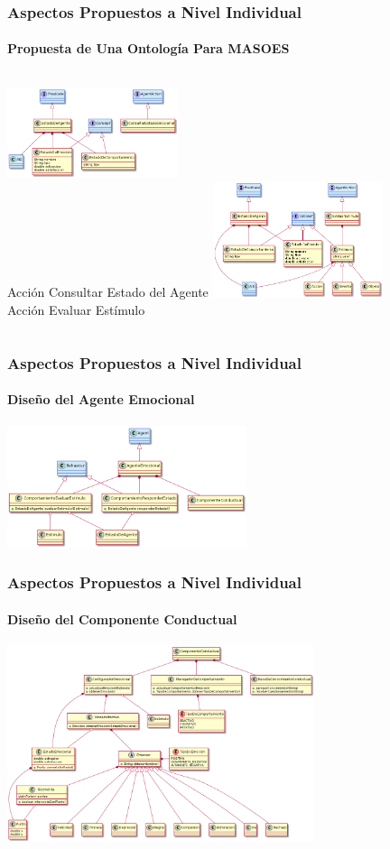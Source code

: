 \documentclass{beamer}
\begin{document}
\begin{frame}
\frametitle{Aspectos Propuestos a Nivel Individual}
\framesubtitle{Propuesta de Una Ontología Para MASOES}
\begin{columns}
\centering
\tiny
\includegraphics[width=5cm]{ilustraciones/ontologia-masoes-estado}
\\
Acción Consultar Estado del Agente
\centering
\tiny
\includegraphics[width=5cm]{ilustraciones/ontologia-masoes-estimulo}
\\
Acción Evaluar Estímulo
\end{columns}
\end{frame}

\begin{frame}
\frametitle{Aspectos Propuestos a Nivel Individual}
\framesubtitle{Diseño del Agente Emocional}
\centering
\includegraphics[width=7cm]{ilustraciones/diseno-nivel-individual}
\end{frame}

\begin{frame}
\frametitle{Aspectos Propuestos a Nivel Individual}
\framesubtitle{Diseño del Componente Conductual}
\centering
\includegraphics[width=9cm]{ilustraciones/diseno-componente-conductual}
\end{frame}
\end{document}
